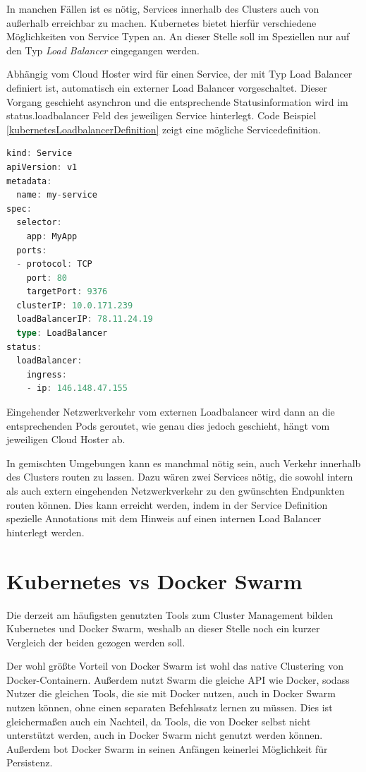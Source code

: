 In manchen Fällen ist es nötig, Services innerhalb des Clusters auch von außerhalb erreichbar zu machen.
Kubernetes bietet hierfür verschiedene Möglichkeiten von Service Typen an.
An dieser Stelle soll im Speziellen nur auf den Typ \textit{Load Balancer} eingegangen werden.

Abhängig vom Cloud Hoster wird für einen Service, der mit Typ Load Balancer definiert ist, automatisch ein externer Load Balancer vorgeschaltet.
Dieser Vorgang geschieht asynchron und die entsprechende Statusinformation wird im \glqq{}status.loadbalancer\grqq{} Feld des jeweiligen Service hinterlegt.
Code Beispiel \ref{kubernetesLoadbalancerDefinition} zeigt eine mögliche Servicedefinition.

\begin{minipage}{\linewidth}
	\begin{lstlisting}[frame=single,caption=Kubernetes Service mit Loadbalancer Definition, label=kubernetesLoadbalancerDefinition, language=Scala]
kind: Service
apiVersion: v1
metadata:
  name: my-service
spec:
  selector:
    app: MyApp
  ports:
  - protocol: TCP
    port: 80
    targetPort: 9376
  clusterIP: 10.0.171.239
  loadBalancerIP: 78.11.24.19
  type: LoadBalancer
status:
  loadBalancer:
    ingress:
    - ip: 146.148.47.155
	\end{lstlisting}
\end{minipage}

Eingehender Netzwerkverkehr vom externen Loadbalancer wird dann an die entsprechenden Pods geroutet, wie genau dies jedoch geschieht, hängt vom jeweiligen Cloud Hoster ab.

In gemischten Umgebungen kann es manchmal nötig sein, auch Verkehr innerhalb des Clusters routen zu lassen.
Dazu wären zwei Services nötig, die sowohl intern als auch extern eingehenden Netzwerkverkehr zu den gwünschten Endpunkten routen können.
Dies kann erreicht werden, indem in der Service Definition spezielle Annotations mit dem Hinweis auf einen internen Load Balancer hinterlegt werden.

\section{Kubernetes vs Docker Swarm}

Die derzeit am häufigsten genutzten Tools zum Cluster Management bilden Kubernetes und Docker Swarm, weshalb an dieser Stelle noch ein kurzer Vergleich der beiden gezogen werden soll.

Der wohl größte Vorteil von Docker Swarm ist wohl das native Clustering von Docker-Containern.
Außerdem nutzt Swarm die gleiche API wie Docker, sodass Nutzer die gleichen Tools, die sie mit Docker nutzen, auch in Docker Swarm nutzen können, ohne einen separaten Befehlssatz lernen zu müssen.
Dies ist gleichermaßen auch ein Nachteil, da Tools, die von Docker selbst nicht unterstützt werden, auch in Docker Swarm nicht genutzt werden können.
Außerdem bot Docker Swarm in seinen Anfängen keinerlei Möglichkeit für Persistenz.

